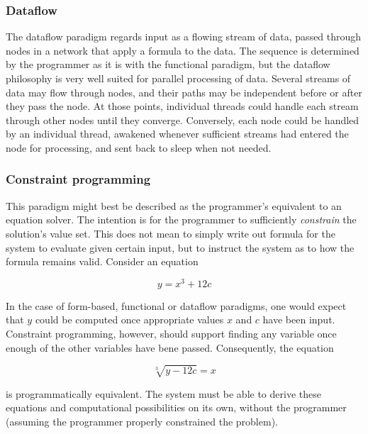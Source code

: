 \subsubsection*{Dataflow}
The dataflow paradigm regards input as a flowing stream of data, passed through nodes in a network that apply a formula to the data. The sequence is determined by the programmer as it is with the functional paradigm, but the dataflow philosophy is very well suited for parallel processing of data. Several streams of data may flow through nodes, and their paths may be independent before or after they pass the node. At those points, individual threads could handle each stream through other nodes until they converge. Conversely, each node could be handled by an individual thread, awakened whenever sufficient streams had entered the node for processing, and sent back to sleep when not needed.

\subsubsection*{Constraint programming}
This paradigm might best be described as the programmer's equivalent to an equation solver. The intention is for the programmer to sufficiently \emph{constrain} the solution's value set. This does not mean to simply write out formula for the system to evaluate given certain input, but to instruct the system as to how the formula remains valid. Consider an equation

\[
y = x^3 + 12c
\]

In the case of form-based, functional or dataflow paradigms, one would expect that $y$ could be computed once appropriate values $x$ and $c$ have been input. Constraint programming, however, should support finding any variable once enough of the other variables have bene passed. Consequently, the equation

\[
\sqrt[3]{y - 12c} = x
\]

is programmatically equivalent. The system must be able to derive these equations and computational possibilities on its own, without the programmer (assuming the programmer properly constrained the problem).